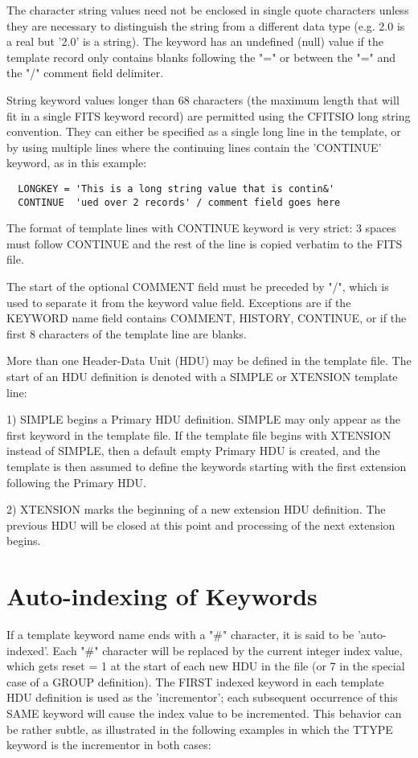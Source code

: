 \documentclass[11pt]{book}
\begin{document}
The character string values need not be enclosed in single quote characters
unless they are necessary to distinguish the string from a different
data type (e.g.  2.0 is a real but '2.0' is a string).  The keyword has
an undefined (null) value if the template record only contains blanks
following the "=" or between the "=" and the "/" comment field
delimiter.

String keyword values longer than 68 characters (the maximum length
that will fit in a single FITS keyword record) are permitted using the
CFITSIO long string convention. They can either be specified as a
single long line in the template, or by using multiple lines where the
continuing lines contain the 'CONTINUE' keyword, as in this example:

\begin{verbatim}
  LONGKEY = 'This is a long string value that is contin&'
  CONTINUE  'ued over 2 records' / comment field goes here
\end{verbatim}
The format of template lines with CONTINUE keyword is very strict:  3
spaces must follow CONTINUE and the rest of the line is copied verbatim
to the FITS file.

The start of the optional COMMENT field must be preceded by "/", which
is used to separate it from the keyword value field. Exceptions are if
the KEYWORD name field contains COMMENT, HISTORY, CONTINUE, or if the
first 8 characters of the template line are blanks.

More than one Header-Data Unit (HDU) may be defined in the template
file.  The start of an HDU definition is denoted with a SIMPLE or
XTENSION template line:

1) SIMPLE begins a Primary HDU definition. SIMPLE may only appear as
the  first keyword in the template file. If the template file begins
with XTENSION instead of SIMPLE, then a default empty Primary HDU is
created, and the template is then assumed to define the keywords
starting with the first extension following the Primary HDU.

2) XTENSION marks the beginning of a new extension HDU definition.  The
previous HDU will be closed at this point and processing of the next
extension begins.


\section{Auto-indexing of Keywords}

If a template keyword name ends with a "\#" character, it is said to be
'auto-indexed'.   Each "\#" character will be replaced by the current
integer index value, which gets reset = 1 at the start of each new HDU
in the file (or 7 in the special case of a GROUP definition).  The
FIRST indexed keyword in each template HDU definition is used as the
'incrementor';  each subsequent occurrence of this SAME keyword will
cause the index value to be incremented.  This behavior can be rather
subtle, as illustrated in the following examples in which the TTYPE
keyword is the incrementor in both cases:
\end{document}
